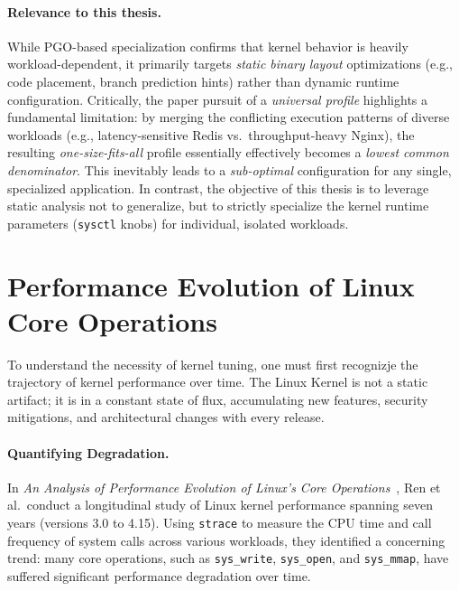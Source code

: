 \paragraph{Relevance to this thesis.}
While PGO-based specialization confirms that kernel behavior is heavily workload-dependent, it primarily targets \textit{static binary layout} optimizations (e.g., code placement, branch prediction hints) rather than dynamic runtime configuration.
Critically, the paper pursuit of a \textit{universal profile} highlights a fundamental limitation: by merging the conflicting execution patterns of diverse workloads (e.g., latency-sensitive Redis vs.\ throughput-heavy Nginx), the resulting \textit{one-size-fits-all} profile essentially effectively becomes a \textit{lowest common denominator}.
This inevitably leads to a \textit{sub-optimal} configuration for any single, specialized application.
In contrast, the objective of this thesis is to leverage static analysis not to generalize, but to strictly specialize the kernel runtime parameters (\texttt{sysctl} knobs) for individual, isolated workloads.

\section{Performance Evolution of Linux Core Operations}\label{sec:bg-linux-evolution}

To understand the necessity of kernel tuning, one must first recognizje the trajectory of kernel performance over time. The Linux Kernel is not a static artifact; it is in a constant state of flux, accumulating new features, security mitigations, and architectural changes with every release.

\paragraph{Quantifying Degradation.}
In \textit{An Analysis of Performance Evolution of Linux's Core Operations}~\cite{linux_core_ops_evolution}, Ren et al.\ conduct a longitudinal study of Linux kernel performance spanning seven years (versions 3.0 to 4.15). 
Using \texttt{strace} to measure the CPU time and call frequency of system calls across various workloads, they identified a concerning trend: many core operations, such as \texttt{sys\_write}, \texttt{sys\_open}, and \texttt{sys\_mmap}, have suffered significant performance degradation over time.

